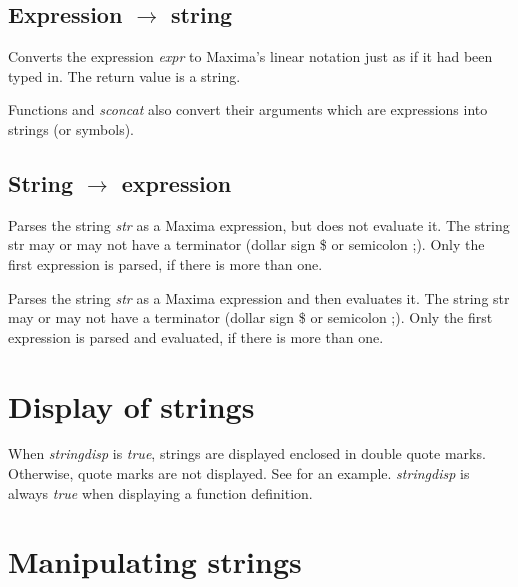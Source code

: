 \documentclass[../Maxima_Workbook.tex]{subfiles}
\begin{document}
\subsection{Expression $ \rightarrow $ string}

\lz {} \hfill \tcr{[function]}

\lz Converts the expression \emph{expr} to Maxima’s linear notation just as if it had been typed in. The return value is a string.

\lz Functions  and \emph{sconcat} also convert their arguments which are expressions into strings (or symbols).

\subsection{String $ \rightarrow $ expression}

\lz {} \hfill {}

\lz Parses the string \emph{str} as a Maxima expression, but does not evaluate it. The string str may or may not have a terminator (dollar sign \$ or semicolon ;). Only the first expression is parsed, if there is more than one.

\lzz {} \hfill {}

\lz Parses the string \emph{str} as a Maxima expression and then evaluates it. The string str may or may not have a terminator (dollar sign \$ or semicolon ;). Only the first expression is parsed and evaluated, if there is more than one.

\section{Display of strings}

\lz {}  \hfill {}

\lz When \emph{stringdisp} is \emph{true}, strings are displayed enclosed in double quote marks. Otherwise, quote marks are not displayed. See  for an example. \emph{stringdisp} is always \emph{true} when displaying a function definition.

\section{Manipulating strings}
\end{document}

